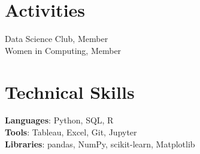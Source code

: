 \section{Activities}
 \begin{itemize}[leftmargin=0.15in, label={}]
    \small{\item{
     Data Science Club, Member \\
     Women in Computing, Member
    }}
 \end{itemize}

\section{Technical Skills}
 \begin{itemize}[leftmargin=0.15in, label={}]
    \small{\item{
     \textbf{Languages}{: Python, SQL, R} \\
     \textbf{Tools}{: Tableau, Excel, Git, Jupyter} \\
     \textbf{Libraries}{: pandas, NumPy, scikit-learn, Matplotlib}
    }}
 \end{itemize}

